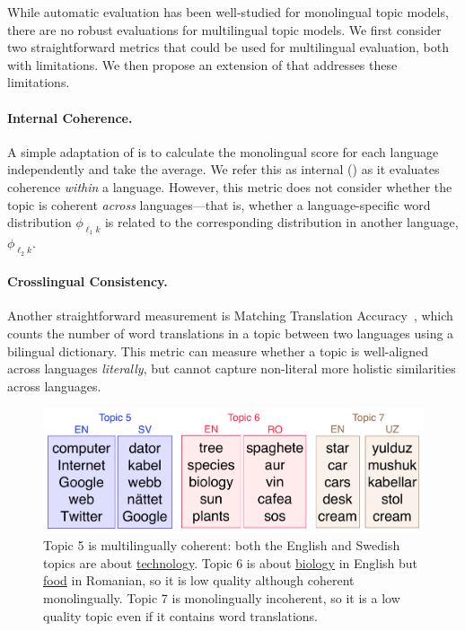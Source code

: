 While automatic evaluation has been well-studied for monolingual topic
models, there are no robust evaluations for multilingual topic models.
We first consider two straightforward metrics that could be used for
multilingual evaluation, both with limitations. We then propose an
extension of \npmi{} that addresses these limitations.

\paragraph{Internal Coherence.}

A simple adaptation of \npmi{} is to
calculate the monolingual \npmi{} score for each language
independently and take the average.  We refer this as internal \npmi{}
(\inpmi{}) as it evaluates coherence \textit{within} a language.
However, this metric does not consider whether the topic is coherent
\textit{across} languages---that is, whether a language-specific word
distribution $\phi_{\ell_1k}$ is related to the corresponding
distribution in another language, $\phi_{\ell_2k}$.

\paragraph{Crosslingual Consistency.}

Another straightforward measurement is Matching Translation
Accuracy~\cite[\mta{}]{Boyd-Graber:Blei-2009}, which counts the number
of word translations in a topic between two languages using a
bilingual dictionary.  This metric can measure whether a topic is
well-aligned across languages \textit{literally}, but cannot capture
non-literal more holistic similarities across languages.

\begin{figure}[t!]
	\centering
	\includegraphics[width=\linewidth]{2018_naacl_mltm_eval/figures/topic_examples}
	\caption{Topic 5 is multilingually coherent: both the English and
		Swedish topics are about \underline{technology}. Topic 6 is about
		\underline{biology} in English but \underline{food} in Romanian, so
		it is low quality although coherent monolingually. Topic 7
		is monolingually incoherent, so it is a low quality topic even if
		it contains word translations.}
	\label{fig:example}
\end{figure}


